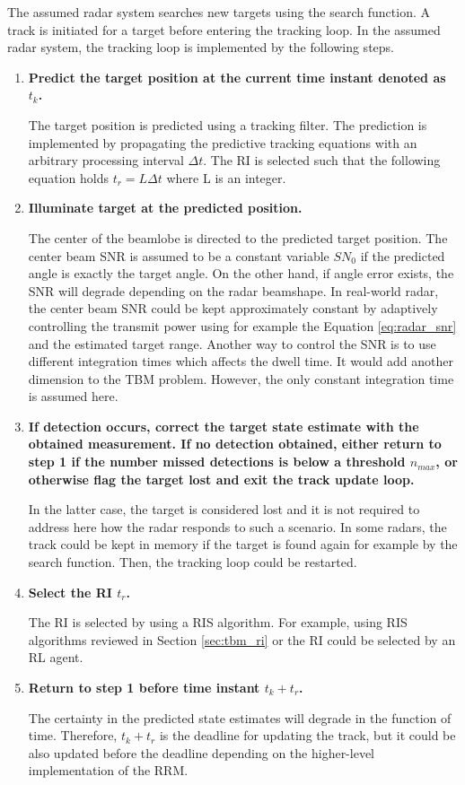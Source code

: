 \documentclass[english, 12pt, a4paper, elec, utf8, a-1b, online]{aaltothesis}
\newcommand{\dt}{\Delta t}
\newcommand{\ri}{t_r}
\begin{document}
The assumed radar system searches new targets using the search function. 
A track is initiated for a target before entering the tracking loop. 
In the assumed radar system, the tracking loop is implemented by the following steps.
\begin{enumerate}
\item\textbf{Predict the target position at the current time instant denoted as $t_k$.}

The target position is predicted using a tracking filter. The prediction is implemented by propagating the predictive tracking equations with an arbitrary processing interval $\dt$. The RI is selected such that the following equation holds $ \ri  =L \dt$ where L is an integer.

\item\textbf{Illuminate target at the predicted position.}

The center of the beamlobe is directed to the predicted target position. 
The center beam SNR is assumed to be a constant variable $SN_0$ if the predicted angle is exactly the target angle. 
On the other hand, if angle error exists, the SNR will degrade depending on the radar beamshape. 
In real-world radar, the center beam SNR could be kept approximately constant by adaptively controlling the transmit power using for example the Equation \eqref{eq:radar_snr} and the estimated target range. 
Another way to control the SNR is to use different integration times which affects the dwell time. 
It would add another dimension to the TBM problem. 
However, the only constant integration time is assumed here.

\item\textbf{If detection occurs, correct the target state estimate with the obtained measurement. If no detection obtained, either return to step 1 if the number missed detections is below a threshold $n_{max}$, or otherwise flag the target lost and exit the track update loop.}

In the latter case, the target is considered lost and it is not required to address here how the radar responds to such a scenario. 
In some radars, the track could be kept in memory if the target is found again for example by the search function. 
Then, the tracking loop could be restarted.


\item\textbf{Select the RI $\ri$.}

The RI is selected by using a RIS algorithm.
For example, using RIS algorithms reviewed in Section \ref{sec:tbm_ri} or the RI could be selected by an RL agent.

\item\textbf{Return to step 1 before time instant $t_k + \ri$.}

The certainty in the predicted state estimates will degrade in the function of time. Therefore, $t_k + \ri$ is the deadline for updating the track, but it could be also updated before the deadline depending on the higher-level implementation of the RRM.

\end{enumerate}
\end{document}

